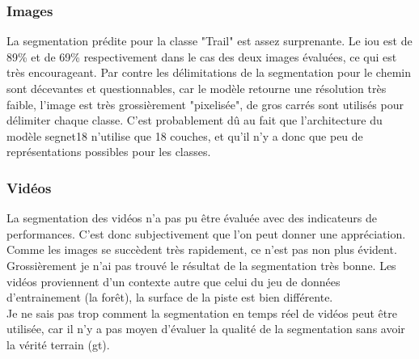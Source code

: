 \subsubsection{Images}
La segmentation prédite pour la classe "Trail" est assez surprenante. Le \acrshort{iou} est de 89\% et de 69\% respectivement dans le cas des deux images évaluées, ce qui est très encourageant. Par contre les délimitations de la segmentation pour le chemin sont décevantes et questionnables, car le modèle retourne une résolution très faible, l'image est très grossièrement "pixelisée", de gros carrés sont utilisés pour délimiter chaque classe. C'est probablement dû au fait que l'architecture du modèle segnet18 n'utilise que 18 couches, et qu'il n'y a donc que peu de représentations possibles pour les classes. 
\subsubsection{Vidéos}
La segmentation des vidéos n'a pas pu être évaluée avec des indicateurs de performances. C'est donc subjectivement que l'on peut donner une appréciation. Comme les images se succèdent très rapidement, ce n'est pas non plus évident. Grossièrement je n'ai pas trouvé le résultat de la segmentation très bonne. Les vidéos proviennent d'un contexte autre que celui du jeu de données d'entrainement (la forêt), la surface de la piste est bien différente. 
\vspace{\baselineskip}
\\
\noindent Je ne sais pas trop comment la segmentation en temps réel de vidéos peut être utilisée, car il n'y a pas moyen d'évaluer la qualité de la segmentation sans avoir la vérité terrain (\acrshort{gt}).
